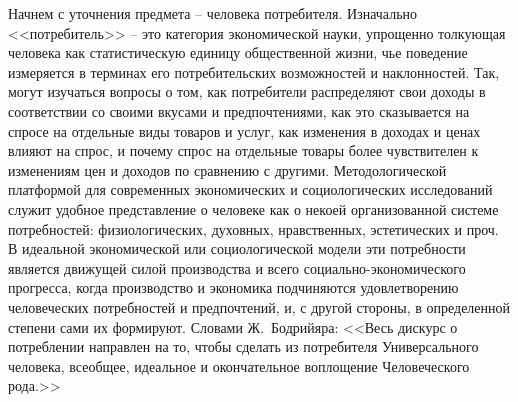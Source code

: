 Начнем с уточнения предмета -- человека потребителя. Изначально <<потребитель>> --
это категория экономической науки, упрощенно толкующая человека как
статистическую единицу общественной жизни, чье поведение измеряется в
терминах его потребительских возможностей и наклонностей. Так, могут изучаться
вопросы о том, как потребители распределяют свои доходы в соответствии со своими
вкусами и предпочтениями, как это сказывается на спросе на отдельные виды товаров
и услуг, как изменения в доходах и ценах влияют на спрос, и почему спрос на отдельные
товары более чувствителен к изменениям цен и доходов по сравнению с другими.
Методологической платформой для современных экономических и социологических
исследований служит удобное представление о человеке как о некоей организованной
системе потребностей: физиологических, духовных, нравственных, эстетических и проч.
В идеальной экономической или социологической модели эти потребности является
движущей силой производства и всего социально-экономического прогресса, когда
производство и экономика подчиняются удовлетворению человеческих потребностей
и предпочтений, и, с другой стороны, в определенной степени сами их формируют.
Словами Ж.~Бодрийяра: <<Весь дискурс о потреблении направлен на то, чтобы сделать
из потребителя Универсального человека, всеобщее, идеальное и окончательное
воплощение Человеческого рода.>>\autocite{bodriyar_society}
\autocite{ballestrem1999}\autocite{book:bodriyar}\autocite{bunkina2000}\autocite{klein2003}
\autocite{kuli2000}\autocite{livshits2001}\autocite{markuze1994}\autocite{maslow2009}
\autocite{sibruk2005}\autocite{fukuyama2004}\autocite{alias2001}
